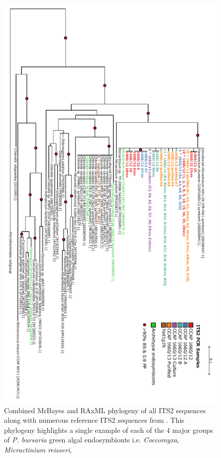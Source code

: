 \begin{figure}
    \includegraphics[height=0.75\textheight]{its_phylo.pdf}
    \caption[ITS2 phylogeny]{Combined MrBayes and RAxML phylogeny of all ITS2 sequences
    along with numerous reference ITS2 sequences from \citep{Hoshina2010,Hoshina2013}.
    This phylogeny highlights a single example of each of the 4 major groups of 
    \textit{P. bursaria} green algal endosymbionts i.e. \textit{Coccomyxa}, \textit{Micractinium reisseri},
}
\end{figure}
